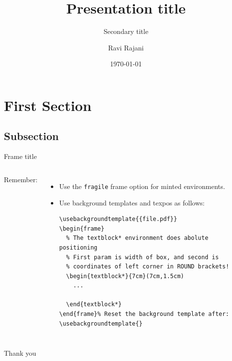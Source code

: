 \documentclass[handout,10pt]{beamer}
\title
{Presentation title}
\subtitle
{Secondary title}
\author
{Ravi Rajani}
\institute
{School of Computing and Communications}
\date{\today}
\def\titlepagewidth{\dimexpr\paperwidth - 4em\relax}
\def\innerframewidth{\titlepagewidth}
\def\titleboxheight{\dimexpr\paperheight - 4em\relax}
\def\titletopmargin{\dimexpr 2em + .5\textheight - .5\paperheight\relax}
\begin{document}
\begin{frame}
  \titlepage
\end{frame}


\section{First Section}

\subsection{Subsection}

\begin{frame}[fragile]{Frame title}
  \begin{columns}
    \column{\innerframewidth}
    Remember:
    \begin{itemize}
      \item Use the \texttt{fragile} frame option for minted environments.
      \item Use background templates and texpos as follows:
            \begin{verbatim}
\usebackgroundtemplate{{file.pdf}}
\begin{frame}
  % The textblock* environment does abolute positioning
  % First param is width of box, and second is
  % coordinates of left corner in ROUND brackets!
  \begin{textblock*}{7cm}(7cm,1.5cm)
    ...
    
  \end{textblock*}
\end{frame}% Reset the background template after:
\usebackgroundtemplate{}
\end{verbatim}
    \end{itemize}
  \end{columns}
\end{frame}

\begin{frame}
  \nointerlineskip%
  \vspace{\titletopmargin}
  \begin{columns}\column{\titlepagewidth}
  \begin{minipage}[c][\dimexpr \titleboxheight - .8cm\relax][c]{\textwidth}\raggedright
    Thank you%
  \end{minipage}
  \begin{minipage}[c][.8cm][b]{\textwidth}
    \inserttitlegraphic%
  \end{minipage}
\end{columns}
\end{frame}
\end{document}
